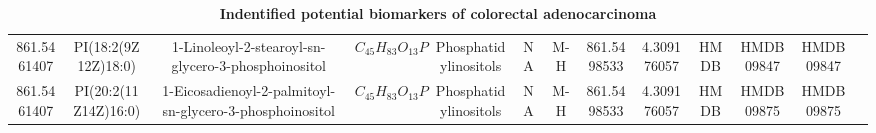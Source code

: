 \documentclass{WileyMSP-template}
\begin{document}
\begin{landscape}
\begin{table}
\begin{adjustbox}{center}
{\begin{tabular}{|c|c|c|c|c|c|c|c|c|c|c|c|c|}
            861.5461407 & PI(18:2(9Z12Z)18:0) & 1-Linoleoyl-2-stearoyl-sn-glycero-3-phosphoinositol & $ C_{45}H_{83}O_{13}P $ & Phosphatidylinositols & NA & M-H & 861.5498533 & 4.309176057 & HMDB & HMDB09847 & HMDB09847\\
            861.5461407 & PI(20:2(11Z14Z)16:0) & 1-Eicosadienoyl-2-palmitoyl-sn-glycero-3-phosphoinositol & $ C_{45}H_{83}O_{13}P $ & Phosphatidylinositols & NA & M-H & 861.5498533 & 4.309176057 & HMDB & HMDB09875 & HMDB09875\\
            \bottomrule
            
        \end{tabular}
        }
    \end{adjustbox}
    \caption{\textbf{Indentified potential biomarkers of colorectal adenocarcinoma}}
    \label{tab:colorectaltab-a}
\end{table}
\end{landscape}
\end{document}
